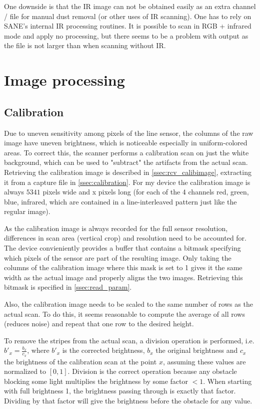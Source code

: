 \documentclass{article}
\begin{document}
One downside is that the IR image can not be obtained easily as an extra channel
/ file for manual dust removal (or other uses of IR scanning). One has to rely
on SANE's internal IR processing routines. It is possible to scan in RGB + infrared
mode and apply no processing, but there seems to be a problem with output as the
file is not larger than when scanning without IR.

\section{Image processing}
\label{sec:imgproc}

\subsection{Calibration}
\label{ssec:imgproc_calib}

Due to uneven sensitivity among pixels of the line sensor, the columns of the raw image
have uneven brightness, which is noticeable especially in uniform-colored areas.
To correct this, the scanner performs a calibration scan on just the white background,
which can be used to "subtract" the artifacts from the actual scan.
Retrieving the calibration image is described in \ref{ssec:rcv_calibimage}, extracting it
from a capture file in \ref{ssec:calibration}. For my device the calibration image is always
$5341$ pixels wide and x pixels long (for each of the 4 channels red, green, blue, infrared,
which are contained in a line-interleaved pattern just like the regular image).

As the calibration image is always recorded for the full sensor resolution, differences in
scan area (vertical crop) and resolution need to be accounted for. The device convieniently
provides a buffer that contains a bitmask specifying which pixels of the sensor are part of the
resulting image. Only taking the columns of the calibration image where this mask is set to 1
gives it the same width as the actual image and properly aligns the two images.
Retrieving this bitmask is specified in \ref{ssec:read_param}.

Also, the calibration image needs to be scaled to the same number of rows as the actual scan.
To do this, it seems reasonable to compute the average of all rows (reduces noise) and repeat
that one row to the desired height.

To remove the stripes from the actual scan, a division operation is performed, i.e.
$b'_{x} = \frac{b_{x}}{c_{x}}$, where $b'_{x}$ is the corrected brightness, $b_x$
the original brightness and $c_{x}$ the brightness of the calibration scan at the point $x$,
assuming these values are normalized to $[0, 1]$. Division is the correct operation because
any obstacle blocking some light multiplies the brightness by some factor $< 1$. When
starting with full brightness 1, the brightness passing through is exactly that factor.
Dividing by that factor will give the brightness before the obstacle for any value.
\end{document}
